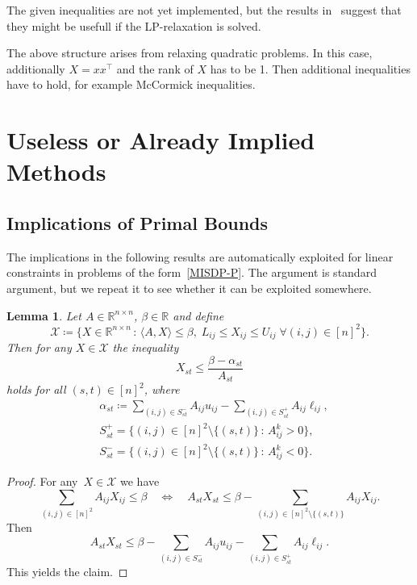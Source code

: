 \documentclass[10pt, a4paper]{article}
\newcommand{\suchthat}{\,:\,}
\newcommand{\define}{\coloneqq}
\newcommand{\skal}[2]{\langle{#1},{#2}\rangle}
\newcommand{\T}{^{\top}}
\newcommand{\R}{\mathds{R}}
\newtheorem{lemma}[theorem]{Lemma}
\begin{document}
The given inequalities are not yet implemented, but the results
in~\cite{NohRS20} suggest that they might be usefull if the LP-relaxation
is solved.

The above structure arises from relaxing quadratic problems. In this case,
additionally $X = x x\T$ and the rank of $X$ has to be 1. Then additional
inequalities have to hold, for example McCormick inequalities.



\section{Useless or Already Implied Methods}


\subsection{Implications of Primal Bounds}

The implications in the following results are automatically exploited for
linear constraints in problems of the form~\eqref{MISDP-P}. The argument
is standard argument, but we repeat it to see whether it can be exploited
somewhere.

\begin{lemma}
  Let $A \in \R^{n \times n}$, $\beta \in \R$ and define
  \[
    \mathcal{X} \define \{ X \in \R^{n\times n} \suchthat \skal{A}{X} \leq
    \beta,\; L_{ij} \leq X_{ij} \leq U_{ij}\; \forall (i,j) \in [n]^2\}.
  \]
  Then for any $X \in \mathcal{X}$ the inequality
  \[
    X_{st} \leq \frac{\beta - \alpha_{st}}{A_{st}}
  \]
  holds for all $(s,t) \in [n]^2$, where
  \begin{align*}
    & \alpha_{st} \define \sum_{(i,j) \in S^-_{st}} A_{ij} u_{ij} - \sum_{(i,j) \in S^+_{st}} A_{ij} \ell_{ij},\\
    & S^+_{st} = \{(i,j) \in [n]^2 \setminus \{(s,t)\} \suchthat A^k_{ij} > 0\},\\
    & S^-_{st} = \{(i,j) \in [n]^2 \setminus \{(s,t)\} \suchthat A^k_{ij} < 0\}.
  \end{align*}
\end{lemma}

\begin{proof}
  For any~$X \in \mathcal{X}$ we have
  \[
    \sum_{(i,j) \in [n]^2} A_{ij} X_{ij} \leq \beta
    \quad\Leftrightarrow\quad A_{st} X_{st} \leq \beta - \sum_{(i,j) \in [n]^2
      \setminus \{(s,t)\}} A_{ij} X_{ij}.
  \]
  Then
  \[
    A_{st} X_{st} \leq \beta - \sum_{(i,j) \in S^-_{st}} A_{ij} u_{ij} - \sum_{(i,j) \in S^+_{st}} A_{ij} \ell_{ij}.
  \]
  This yields the claim.
\end{proof}
\end{document}
